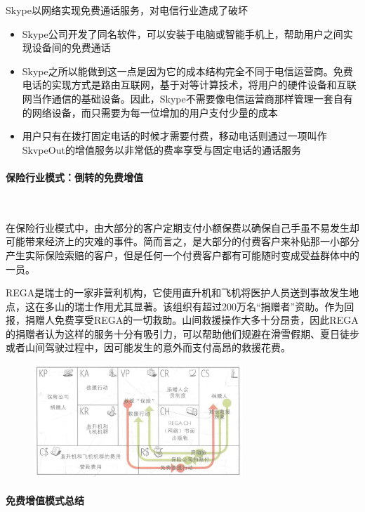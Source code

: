     Skype以网络实现免费通话服务，对电信行业造成了破坏
    \begin{itemize}
        \item Skype公司开发了同名软件，可以安装于电脑或智能手机上，帮助用户之间实现设备间的免费通话
        \item Skype之所以能做到这一点是因为它的成本结构完全不同于电信运营商。免费电话的实现方式是路由互联网，基于对等计算技术，将用户的硬件设备和互联网当作通信的基础设备。因此，Skype不需要像电信运营商那样管理一套自有的网络设备，而只需要为每一位增加的用户支付少量的成本
        \item 用户只有在拨打固定电话的时候才需要付费，移动电话则通过一项叫作SkvpeOut的增值服务以非常低的费率享受与固定电话的通话服务
    \end{itemize}


    \paragraph{保险行业模式：倒转的免费增值}~{}

    在保险行业模式中，由大部分的客户定期支付小额保费以确保自己手虽不易发生却可能带来经济上的灾难的事件。简而言之，是大部分的付费客户来补贴那一小部分产生实际保险索赔的客户，但是任何一个付费客户都有可能随时变成受益群体中的一员。

    REGA是瑞士的一家非营利机构，它使用直升机和飞机将医护人员送到事故发生地点，这在多山的瑞士作用尤其显著。该组织有超过200万名“捐赠者”资助。作为回报，捐赠人免费享受REGA的一切救助。山间救援操作大多十分昂贵，因此REGA的捐赠者认为这样的服务十分有吸引力，可以帮助他们规避在滑雪假期、夏日徒步或者山间驾驶过程中，因可能发生的意外而支付高昂的救援花费。
    \begin{figure}[H]
		\centering
        \vspace{-0.5em}
		\includegraphics[width=0.7\textwidth]{img/保险行业模式.png}
        \vspace{-0.5em}
	\end{figure}

    \paragraph{免费增值模式总结}~{}

